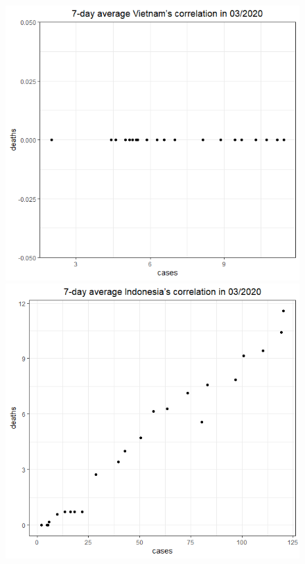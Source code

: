 \documentclass[english,10pt,table]{beamer}
\begin{document}
{\begin{figure}[H]
\begin{center}
        \includegraphics[scale = 0.2]{ix/ix.3/VN_03_2020.png}
        \includegraphics[scale = 0.2]{ix/ix.3/IDN_03_2020.png}

\end{center}
\end{figure}}
\end{document}

